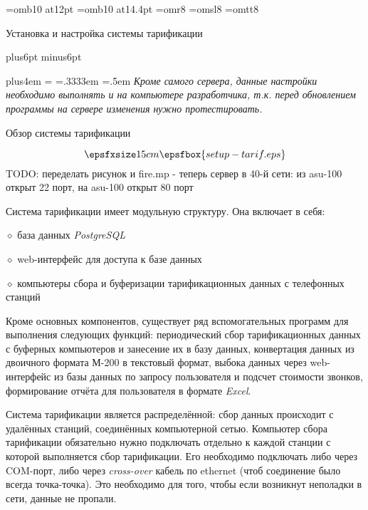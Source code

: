 

\parindent=30pt
\raggedbottom
{}

\font\bbf=omb10 at12pt %
\font\bbbf=omb10 at14.4pt %
\font\rmsmall=omr8
\font\slsmall=omsl8
\font\ttsmall=omtt8

\newcount\secnum
\newcount\subsecnum

\def\raggedcenter{\leftskip=0pt plus4em \rightskip=\leftskip
  \parfillskip=0pt \spaceskip=.3333em \xspaceskip=.5em
  \pretolerance=9999 \tolerance=9999 \parindent=0pt
  \hyphenpenalty=9999 \exhyphenpenalty=9999 }

\rightline{\rmsmall\today\ \hours}
\nobreak\medskip
\centerline{\bbbf Установка и настройка системы тарификации}
\nobreak
\vskip18pt plus6pt minus6pt

\vbox{\raggedcenter\it Кроме самого сервера, данные настройки необходимо выполнять и на компьютере разработчика, т.к. перед обновлением программы на сервере изменения нужно протестировать.}
\bigskip

\newcount\n
\def\N{\advance\n by1\indent\hbox to0pt{\hskip-\parindent\bf\the\n.\hfil}}

\sec Обзор системы тарификации

$$\epsfxsize 15cm \epsfbox{setup-tarif.eps}$$
TODO: переделать рисунок и fire.mp - теперь сервер в 40-й сети: из asu-100 открыт 22 порт,
на asu-100 открыт 80 порт
\parskip=5pt

\noindent
Система тарификации имеет модульную структуру. Она включает в себя:
\item{$\diamond$} база данных {\it PostgreSQL}
\item{$\diamond$} web-интерфейс для доступа к базе данных
\item{$\diamond$} компьютеры сбора и буферизации тарификационных данных с телефонных станций

\noindent
Кроме основных компонентов, существует ряд вспомогательных программ для выполнения следующих функций: периодический сбор тарификационных данных с буферных компьютеров и занесение их в базу данных, конвертация данных из двоичного формата М-200 в текстовый формат, выбока данных через web-интерфейс из базы данных по запросу пользователя и подсчет стоимости звонков, формирование отчёта для пользователя в формате {\it Excel}.

\noindent
Система тарификации является распределённой: сбор данных происходит с удалённых станций, соединённых компьютерной сетью.
Компьютер сбора тарификации обязательно нужно подключать отдельно к каждой станции с которой выполняется сбор тарификации. Его необходимо подключать либо через COM-порт, либо через {\sl cross-over} кабель по ethernet (чтоб соединение было всегда точка-точка). Это необходимо для того, чтобы если возникнут неполадки в сети, данные не пропали.

